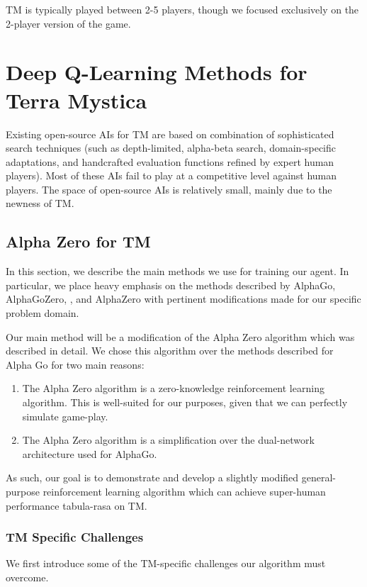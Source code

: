 \documentclass[8pt,twocolumn]{article}
\begin{document}
TM is typically played between 2-5 players, though we focused exclusively on the 2-player version of the game.


\section{Deep Q-Learning Methods for Terra Mystica}
\label{section:deep_qlearning_methods_for_tm}
Existing open-source AIs for TM are based on  combination of sophisticated search techniques (such as depth-limited, alpha-beta search, domain-specific adaptations, and handcrafted evaluation functions refined by expert human players). Most of these AIs fail to play at a competitive level against human players. The space of open-source AIs is relatively small, mainly due to the newness of TM.

\subsection{Alpha Zero for TM}
\label{subsection:alpha_zero_for_tm}
In this section, we describe the main methods we use for training our agent. In particular, we place heavy emphasis on the methods described by AlphaGo\cite{AlphaGo}, AlphaGoZero, \cite{AlphaGoZero}, and AlphaZero \cite{AlphaZero} with pertinent modifications made for our specific problem domain.

Our main method will be a modification of the Alpha Zero \cite{AlphaZero} algorithm which was described in detail. We chose this algorithm over the methods described for Alpha Go \cite{AlphaGo} for two main reasons:
\begin{enumerate}
    \item The Alpha Zero algorithm is a zero-knowledge reinforcement learning algorithm. This is well-suited for our purposes, given that we can perfectly simulate game-play. 
    \item The Alpha Zero algorithm is a simplification over the dual-network architecture used for AlphaGo.
\end{enumerate}

As such, our goal is to demonstrate and develop a slightly modified general-purpose reinforcement learning algorithm which can achieve super-human performance tabula-rasa on TM.

\subsubsection{TM Specific Challenges}
\label{subsubsection:tm_specific_challenges}
We first introduce some of the TM-specific challenges our algorithm must overcome.
\end{document}
